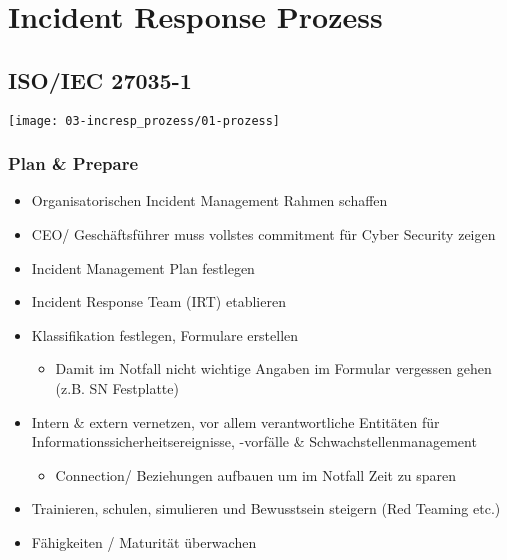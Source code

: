 
\section{Incident Response Prozess}

\subsection{ISO/IEC 27035-1}
\begin{center}
    \vspace{-8pt}
    \texttt{[image: 03-incresp\_prozess/01-prozess]}
    \vspace{-8pt}
\end{center}

\subsubsection{Plan \& Prepare}
\begin{itemize}
    \item Organisatorischen Incident Management Rahmen schaffen
    \item CEO/ Geschäftsführer muss vollstes commitment für Cyber Security zeigen
    \item Incident Management Plan festlegen
    \item Incident Response Team (IRT) etablieren
    \item Klassifikation festlegen, Formulare erstellen
    \begin{itemize}
        \item Damit im Notfall nicht wichtige Angaben im Formular vergessen gehen (z.B. SN Festplatte)
    \end{itemize}
    \item Intern \& extern vernetzen, vor allem verantwortliche Entitäten für Informationssicherheitsereignisse, -vorfälle \& Schwachstellenmanagement
    \begin{itemize}
        \item Connection/ Beziehungen aufbauen um im Notfall Zeit zu sparen
    \end{itemize}
    \item Trainieren, schulen, simulieren und Bewusstsein steigern (Red Teaming etc.)
    \item Fähigkeiten / Maturität überwachen
\end{itemize}

